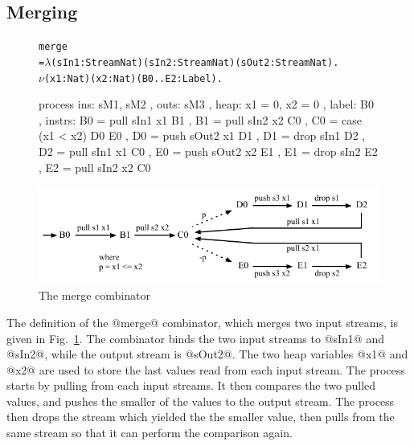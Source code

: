 \subsection{Merging}
\begin{figure}
\begin{alltt}
               merge
                 = \(\lambda\) (sIn1: Stream Nat) (sIn2: Stream Nat) (sOut2: Stream Nat). 
                   \(\nu\) (x1: Nat) (x2: Nat) (B0..E2: Label).
\end{alltt}
\begin{code}
                   process
                   { ins:    { sM1, sM2 }
                   , outs:   { sM3 }
                   , heap:   { x1 = 0, x2 = 0 }
                   , label:  B0
                   , instrs: { B0 = pull sIn1  x1   B1 {}
                             , B1 = pull sIn2  x2   C0 {}
                             , C0 = case (x1 < x2)  D0 {}  E0 {}
                             , D0 = push sOut2 x1   D1 {}
                             , D1 = drop sIn1       D2 {}
                             , D2 = pull sIn1  x1   C0 {}
                             , E0 = push sOut2 x2   E1 {}
                             , E1 = drop sIn2       E2 {}
                             , E2 = pull sIn2 x2    C0 {} } }
\end{code}

\medskip
\includegraphics[scale=1.1]{figures/state-merge.pdf}
\caption{The merge combinator}
\label{fig:Process:Merge}
\end{figure}

The definition of the @merge@ combinator, which merges two input streams, is given in Fig.~\ref{fig:Process:Merge}. The combinator binds the two input streams to @sIn1@ and @sIn2@, while the output stream is @sOut2@. The two heap variables @x1@ and @x2@ are used to store the last values read from each input stream. The process starts by pulling from each input streams. It then compares the two pulled values, and pushes the smaller of the values to the output stream. The process then drops the stream which yielded the the smaller value, then pulls from the same stream so that it can perform the comparison again.

